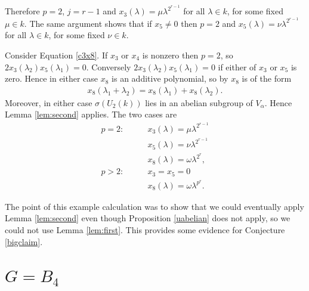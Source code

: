 Therefore $p = 2$, $j=r-1$ and $x_3(\lambda) = \mu \lambda^{2^{r-1}}$ for all $\lambda\in k$, for some fixed $\mu\in k$. The same argument shows that if $x_5 \neq 0$ then $p=2$ and $x_5(\lambda) = \nu \lambda^{2^{r-1}}$ for all $\lambda \in k$, for some fixed $\nu\in k$.

Consider Equation \ref{c3x8}. If $x_3$ or $x_4$ is nonzero then $p=2$, so $2x_3(\lambda_2)x_5(\lambda_1) = 0$. Conversely $2x_3(\lambda_2)x_5(\lambda_1) = 0$ if either of $x_3$ or $x_5$ is zero. Hence in either case $x_8$ is an additive polynomial, so by \cite[\S 20.3, Lemma A]{humphreys1975linear} $x_8$ is of the form
\begin{align*}
	x_8(\lambda_1 + \lambda_2) = x_8(\lambda_1) + x_8(\lambda_2).
\end{align*}
Moreover, in either case $\sigma\left(U_2(k)\right)$ lies in an abelian subgroup of $V_\alpha$. Hence Lemma \ref{lem:second} applies. The two cases are
\begin{align*}
p=2: \qquad&x_3(\lambda) = \mu \lambda^{2^{r-1}} \\
	&x_5(\lambda) = \nu \lambda^{2^{r-1}} \\
	&x_8(\lambda) = \omega \lambda^{2^r}, \\
p>2: \qquad&x_3=x_5=0 \\
	&x_8(\lambda) = \omega \lambda^{p^r}.
\end{align*}

The point of this example calculation was to show that we could eventually apply Lemma \ref{lem:second} even though Proposition \ref{uabelian} does not apply, so we could not use Lemma \ref{lem:first}. This provides some evidence for Conjecture \ref{bigclaim}.



\section{$G = B_4$}
\label{b4}

